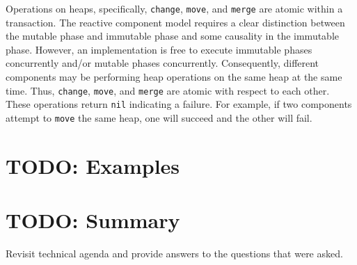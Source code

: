 Operations on heaps, specifically, \verb+change+, \verb+move+, and \verb+merge+ are atomic within a transaction.
The reactive component model requires a clear distinction between the mutable phase and immutable phase and some causality in the immutable phase.
However, an implementation is free to execute immutable phases concurrently and/or mutable phases concurrently.
Consequently, different components may be performing heap operations on the same heap at the same time.
Thus, \verb+change+, \verb+move+, and \verb+merge+ are atomic with respect to each other.
These operations return \verb+nil+ indicating a failure.
For example, if two components attempt to \verb+move+ the same heap, one will succeed and the other will fail.

\section{TODO: Examples}

\section{TODO: Summary}

Revisit technical agenda and provide answers to the questions that were asked.



